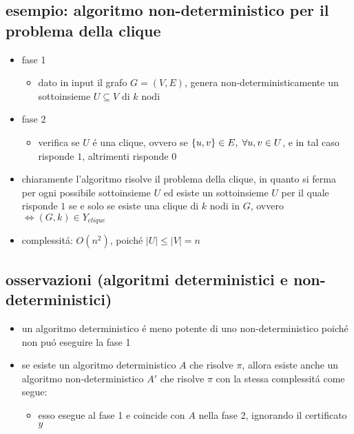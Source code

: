 \subsection*{esempio: algoritmo non-deterministico per il problema della clique}
\begin{flushleft}
	\begin{itemize}
		\item fase 1
		\begin{itemize}
			\item dato in input il grafo $G=(V,E)$, genera non-deterministicamente un sottoinsieme $U\subseteq V$ di $k$ nodi
		\end{itemize}
		\item fase 2
		\begin{itemize}
			\item verifica se $U$ \'e una clique, ovvero se $\{u,v\}\in E,\hspace{0.1cm}\forall u,v\in U$, e in tal caso risponde $1$, altrimenti risponde $0$
		\end{itemize}
	\item chiaramente l'algoritmo risolve il problema della clique, in quanto si ferma per ogni possibile sottoinsieme $U$ ed esiste un sottoinsieme $U$ per il quale risponde $1$ se e solo se esiste una clique di $k$ nodi in $G$, ovvero $\iff(G,k)\in Y_{clique}$
	\item complessit\'a: $O(n^2)$, poich\'e $|U|\leq|V|=n$
	\end{itemize}
\end{flushleft}


\subsection*{osservazioni (algoritmi deterministici e non-deterministici)}
\begin{flushleft}
	\begin{itemize}
		\item un algoritmo deterministico \'e meno potente di uno non-deterministico poich\'e non pu\'o eseguire la fase 1
		\item se esiste un algoritmo deterministico $A$ che risolve $\pi$, allora esiste anche un algoritmo non-deterministico $A'$ che risolve $\pi$ con la stessa complessit\'a come segue:
			\begin{itemize}
				\item esso esegue al fase 1 e coincide con $A$ nella fase 2, ignorando il certificato $y$
			\end{itemize}
	\end{itemize}
\end{flushleft}

